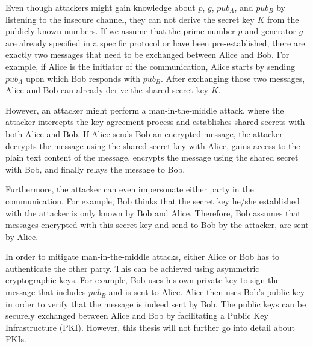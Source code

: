 Even though attackers might gain knowledge about $p$, $g$, $pub_A$, and $pub_B$
by listening to the insecure channel, they can not derive the secret key $K$
from the publicly known numbers. If we assume that the prime number $p$ and
generator $g$ are already specified in a specific protocol or have been
pre-established, there are exactly two messages that need to be exchanged
between Alice and Bob. For example, if Alice is the initiator of the
communication, Alice starts by sending $pub_A$ upon which Bob responds with
$pub_B$. After exchanging those two messages, Alice and Bob can already derive
the shared secret key $K$.

However, an attacker might perform a man-in-the-middle attack, where the
attacker intercepts the key agreement process and establishes shared secrets
with both Alice and Bob. If Alice sends Bob an encrypted message, the attacker
decrypts the message using the shared secret key with Alice, gains access to the
plain text content of the message, encrypts the message using the shared secret
with Bob, and finally relays the message to Bob.

Furthermore, the attacker can even impersonate either party in the
communication. For example, Bob thinks that the secret key he/she established
with the attacker is only known by Bob and Alice. Therefore, Bob assumes that
messages encrypted with this secret key and send to Bob by the attacker, are
sent by Alice.

In order to mitigate man-in-the-middle attacks, either Alice or Bob has to
authenticate the other party. This can be achieved using asymmetric
cryptographic keys. For example, Bob uses his own private key to sign the
message that includes $pub_B$ and is sent to Alice. Alice then uses Bob's public
key in order to verify that the message is indeed sent by Bob. The public keys
can be securely exchanged between Alice and Bob by facilitating a Public Key
Infrastructure (PKI). However, this thesis will not further go into detail about
PKIs.

